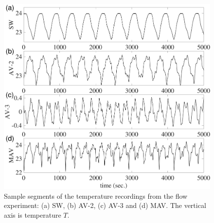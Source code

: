 \documentclass[aip,cha,reprint,nofootinbib]{revtex4-1}
\begin{document}
\begin{figure}
	\centering 
	\includegraphics[width=\columnwidth]{TS_fluid.pdf}
\caption{\small{Sample segments of the temperature recordings from the flow experiment: (a) SW, (b) AV-2, (c) AV-3 and (d) MAV. The vertical axis is temperature $T$. } \label{tseriesFluid}}
\end{figure}
\end{document}
